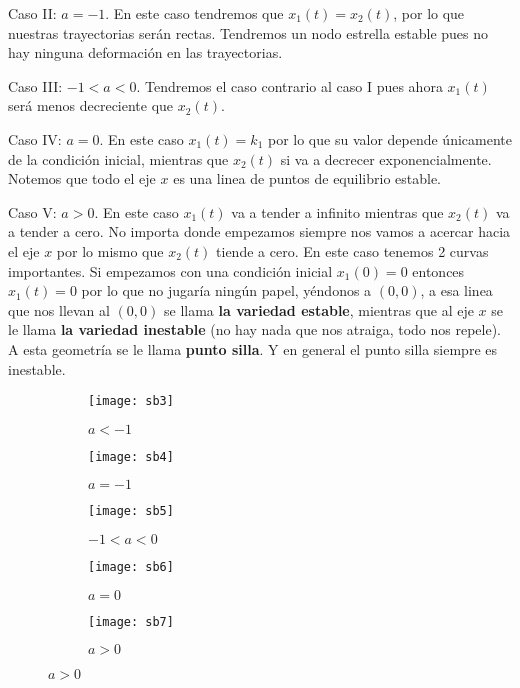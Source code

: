 \begin{ejemplo}
  Caso II:  $a=-1$. En este caso tendremos que $x_1(t)=x_2(t)$, por lo que nuestras trayectorias serán rectas. Tendremos un nodo estrella estable pues no hay ninguna deformación en las trayectorias.
   \vspace{2mm}
  
  Caso III: $-1<a<0$. Tendremos el caso contrario al caso I pues ahora  $x_1(t)$ será menos decreciente que $x_2(t)$.
  \vspace{2mm}
  
  Caso IV: $a=0$. En este caso  $x_1(t)=k_1$ por lo que su valor depende únicamente de la condición inicial, mientras que  $x_2(t)$ si va a decrecer exponencialmente.  Notemos que todo el eje $x$ es una linea de puntos de equilibrio estable.
\vspace{2mm}

  Caso V:  $a>0$. En este caso $x_1(t)$ va a tender a infinito mientras que $x_2(t)$ va a tender a cero. No importa donde empezamos siempre nos vamos a acercar hacia el eje $x$ por lo mismo que  $x_2(t)$ tiende a cero. En este caso tenemos 2 curvas importantes. Si empezamos con una condición inicial $x_1(0)=0$ entonces $x_1(t)=0$ por lo que no jugaría ningún papel, yéndonos a $(0,0)$, a esa linea que nos llevan al  $(0,0)$ se llama  \textbf{la variedad estable}, mientras que al eje $x$ se le llama  \textbf{la variedad inestable} (no hay nada que nos atraiga, todo nos repele). A esta geometría se le llama \textbf{punto silla}. Y en general el punto silla siempre es inestable.                 

  \begin{figure}[!tbp]
    \begin{subfigure}[b]{0.4\textwidth}
      \texttt{[image: sb3]}
      \caption{$a<-1$}
    \end{subfigure}
    \hfill
    \begin{subfigure}[b]{0.4\textwidth}
      \texttt{[image: sb4]}
      \caption{$a=-1$}
    \end{subfigure}
    \begin{subfigure}[b]{0.4\textwidth}
      \texttt{[image: sb5]}
      \caption{$-1<a<0$}
    \end{subfigure} \hfill 
     \begin{subfigure}[b]{0.4\textwidth}
      \texttt{[image: sb6]}
      \caption{$a=0$}
    \end{subfigure}
    \begin{subfigure}{0.4\textwidth}
      \texttt{[image: sb7]}
      \caption{$a>0$}
    \end{subfigure}
  \end{figure}
\end{ejemplo}


